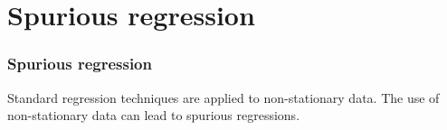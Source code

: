 \documentclass{beamer}
\begin{document}
\section{Spurious regression}
\begin{frame}
\frametitle{Spurious regression}
Standard regression techniques are applied to non-stationary data.
The use of non-stationary data can lead to spurious regressions.  



\end{frame}
\end{document}
